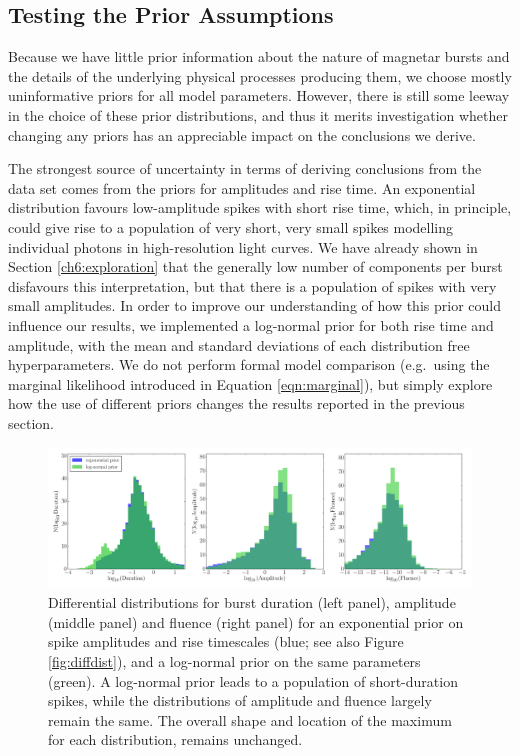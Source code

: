 \documentclass[12pt]{emulateapj}
\begin{document}
\subsection{Testing the Prior Assumptions}
\label{ch6:priortest}
Because we have little prior information about the nature of magnetar bursts and the details of
the underlying physical processes producing them, we choose mostly uninformative priors for all model parameters. However,
there is still some leeway in the choice of these prior distributions, and thus it merits investigation whether changing
any priors has an appreciable impact on the conclusions we derive. 

The strongest source of uncertainty in terms of deriving conclusions from the data set comes from the priors for
amplitudes and rise time. An exponential distribution favours low-amplitude spikes with short rise time, which, in principle,
could give rise to a population of very short, very small spikes modelling individual photons in high-resolution light curves. We have already shown in 
Section \ref{ch6:exploration} that the generally low number of components per burst disfavours this interpretation, but that there is a population of spikes
 with very small amplitudes. In order
to improve our understanding of how this prior could influence our results, we implemented a log-normal prior for both rise time
and amplitude, with the mean and standard deviations of each distribution free hyperparameters. We do not perform formal model comparison
(e.g.\ using the marginal likelihood introduced in Equation \ref{eqn:marginal}), but simply explore how the use of different priors
changes the results reported in the previous section.
\begin{figure}[htbp]
\begin{center}
\includegraphics[width=\textwidth]{ch6f10.pdf}%
\caption{Differential distributions for burst duration (left panel), amplitude (middle panel) and fluence (right panel) for an exponential prior on spike 
amplitudes and rise timescales (blue; see also Figure \ref{fig:diffdist}),
and a log-normal prior on the same parameters (green). A log-normal prior leads to a population of short-duration spikes, while the distributions of amplitude and fluence
largely remain the same. The overall shape and location of the maximum for each distribution, remains unchanged.}
\label{fig:diff_prior}
\end{center}
\end{figure}
\end{document}
